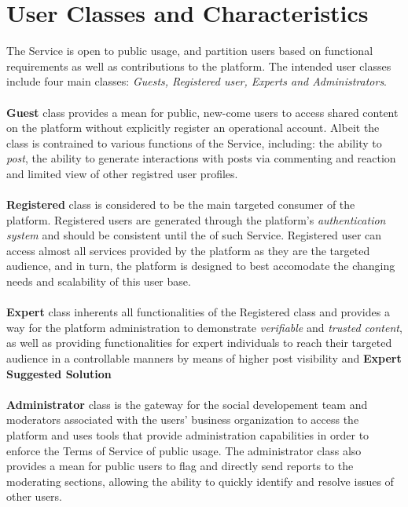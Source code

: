     \section{User Classes and Characteristics}
    The Service is open to public usage, and partition users based on functional requirements as well as contributions to the platform.
    The intended user classes include four main classes: \textit{Guests, Registered user, Experts and Administrators}.
    \\\\
    \textbf{Guest} class provides a mean for public, new-come users to access shared content on the platform without explicitly register an operational account. Albeit the class
    is contrained to various functions of the Service, including: the ability to \textit{post}, the ability to generate interactions with posts via commenting and reaction and limited view of other registred user profiles.
    \\\\
    \textbf{Registered} class is considered to be the main targeted consumer of the platform. Registered users are generated through the platform's \textit{authentication system} and should be consistent
    until the  of such Service. Registered user can access almost all services provided by the platform as they are the targeted audience, and in turn, the platform is designed
    to best accomodate the changing needs and scalability of this user base.
    \\\\
    \textbf{Expert} class inherents all functionalities of the Registered class and provides a way for the platform administration to demonstrate \textit{verifiable} and \textit{trusted content}, as well as providing functionalities
    for expert individuals to reach their targeted audience in a controllable manners by means of higher post visibility and \textbf{Expert Suggested Solution}
    \\\\
    \textbf{Administrator} class is the gateway for the social developement team and moderators associated with the users' business organization to access the platform and uses tools that provide administration capabilities
    in order to enforce the Terms of Service of public usage. The administrator class also provides a mean for public users to flag and directly send reports to the moderating sections, allowing the ability to 
    quickly identify and resolve issues of other users.

